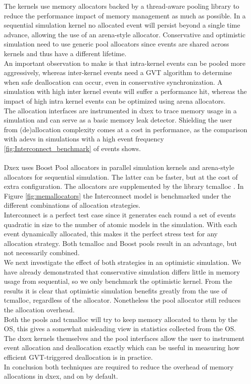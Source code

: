 The kernels use memory allocators backed by a thread-aware pooling library to reduce the performance impact of memory management as much as possible.
In a sequential simulation kernel no allocated event will persist beyond a single time advance, allowing the use of an arena-style allocator. Conservative and optimistic simulation need to use generic pool allocators since events are shared across kernels and thus have a different lifetime. \\
An important observation to make is that intra-kernel events can be pooled more aggressively, whereas inter-kernel events need a GVT algorithm to determine when safe deallocation can occur, even in conservative synchronization. A simulation with high inter kernel events will suffer a performance hit, whereas the impact of high intra kernel events can be optimized using arena allocators.\\
The allocation interfaces are instrumented in dxex to trace memory usage in a simulation and can serve as a basic memory leak detector. Shielding the user from (de)allocation complexity comes at a cost in performance, as the comparison with adevs in simulations with a high event frequency \ref{fig:Interconnect_benchmark} of events shows.\\
\\
Dxex uses Boost Pool\cite{boostpool} allocators in parallel simulation kernels and arena-style allocators for sequential simulation.
The latter can be faster, but at the cost of extra configuration. The allocators are supplemented by the library tcmalloc \cite{tcmalloc}. In Figure \ref{fig:memallocators} the Interconnect model is benchmarked under the different combinations of allocation strategies. \\
Interconnect is a perfect test case since it generates each round a set of events quadratic in size to the number of atomic models in the simulation. With each event dynamically allocated, this makes it the perfect stress test for any allocation strategy. Both tcmalloc and Boost pools result in an advantage, but not necessarily combined. \\
We next investigate the effect of both strategies in an optimistic simulation. We have already demonstrated that conservative simulation differs little in memory usage from sequential, so we only benchmark the optimistic kernel. From the results it is clear that optimistic simulation benefits greatly from the use of tcmalloc, regardless of the allocator. Nonetheless the pool allocator still reduces the allocation overhead. \\
Both the pools and tcmalloc will try to keep memory allocated to them by the OS, this gives a somewhat misleading view in statistics collected from the OS. The dxex kernels themselves and the pool interfaces allow the user to instrument event allocation and deallocation exactly which can be useful in measuring how efficient GVT-triggered deallocation is in practice.\\
In conclusion both techniques are required to reduce the overhead of memory allocations in dxex, and on by default.

